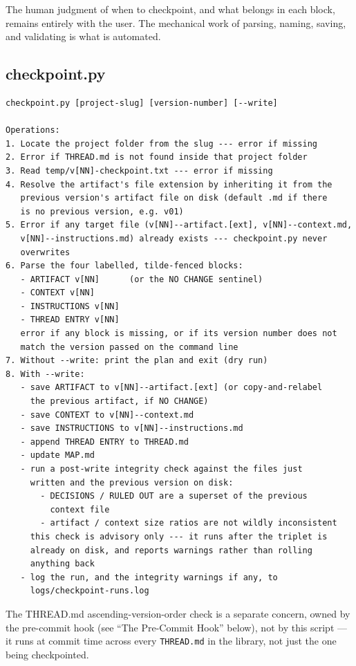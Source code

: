 \documentclass[12pt,letterpaper]{article}
\begin{document}
The human judgment of when to checkpoint, and what belongs in each
block, remains entirely with the user. The mechanical work of parsing,
naming, saving, and validating is what is automated.

\subsection{checkpoint.py}

\begin{lstlisting}
checkpoint.py [project-slug] [version-number] [--write]

Operations:
1. Locate the project folder from the slug --- error if missing
2. Error if THREAD.md is not found inside that project folder
3. Read temp/v[NN]-checkpoint.txt --- error if missing
4. Resolve the artifact's file extension by inheriting it from the
   previous version's artifact file on disk (default .md if there
   is no previous version, e.g. v01)
5. Error if any target file (v[NN]--artifact.[ext], v[NN]--context.md,
   v[NN]--instructions.md) already exists --- checkpoint.py never
   overwrites
6. Parse the four labelled, tilde-fenced blocks:
   - ARTIFACT v[NN]      (or the NO CHANGE sentinel)
   - CONTEXT v[NN]
   - INSTRUCTIONS v[NN]
   - THREAD ENTRY v[NN]
   error if any block is missing, or if its version number does not
   match the version passed on the command line
7. Without --write: print the plan and exit (dry run)
8. With --write:
   - save ARTIFACT to v[NN]--artifact.[ext] (or copy-and-relabel
     the previous artifact, if NO CHANGE)
   - save CONTEXT to v[NN]--context.md
   - save INSTRUCTIONS to v[NN]--instructions.md
   - append THREAD ENTRY to THREAD.md
   - update MAP.md
   - run a post-write integrity check against the files just
     written and the previous version on disk:
       - DECISIONS / RULED OUT are a superset of the previous
         context file
       - artifact / context size ratios are not wildly inconsistent
     this check is advisory only --- it runs after the triplet is
     already on disk, and reports warnings rather than rolling
     anything back
   - log the run, and the integrity warnings if any, to
     logs/checkpoint-runs.log
\end{lstlisting}

The THREAD.md ascending-version-order check is a separate concern,
owned by the pre-commit hook (see ``The Pre-Commit Hook'' below), not
by this script --- it runs at commit time across every
\texttt{THREAD.md} in the library, not just the one being
checkpointed.
\end{document}
